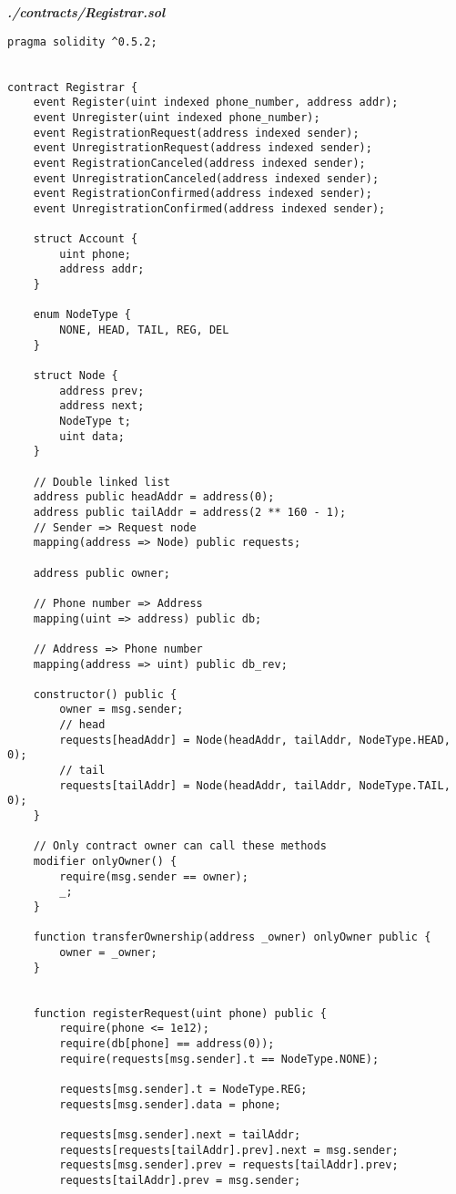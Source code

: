 \textit{\textbf{./contracts/Registrar.sol}}
\begin{verbatim}
pragma solidity ^0.5.2;


contract Registrar {
    event Register(uint indexed phone_number, address addr);
    event Unregister(uint indexed phone_number);
    event RegistrationRequest(address indexed sender);
    event UnregistrationRequest(address indexed sender);
    event RegistrationCanceled(address indexed sender);
    event UnregistrationCanceled(address indexed sender);
    event RegistrationConfirmed(address indexed sender);
    event UnregistrationConfirmed(address indexed sender);

    struct Account {
        uint phone;
        address addr;
    }

    enum NodeType {
        NONE, HEAD, TAIL, REG, DEL
    }

    struct Node {
        address prev;
        address next;
        NodeType t;
        uint data;
    }

    // Double linked list
    address public headAddr = address(0);
    address public tailAddr = address(2 ** 160 - 1);
    // Sender => Request node
    mapping(address => Node) public requests;

    address public owner;

    // Phone number => Address
    mapping(uint => address) public db;

    // Address => Phone number
    mapping(address => uint) public db_rev;

    constructor() public {
        owner = msg.sender;
        // head
        requests[headAddr] = Node(headAddr, tailAddr, NodeType.HEAD, 0);
        // tail
        requests[tailAddr] = Node(headAddr, tailAddr, NodeType.TAIL, 0);
    }

    // Only contract owner can call these methods
    modifier onlyOwner() {
        require(msg.sender == owner);
        _;
    }

    function transferOwnership(address _owner) onlyOwner public {
        owner = _owner;
    }


    function registerRequest(uint phone) public {
        require(phone <= 1e12);
        require(db[phone] == address(0));
        require(requests[msg.sender].t == NodeType.NONE);

        requests[msg.sender].t = NodeType.REG;
        requests[msg.sender].data = phone;

        requests[msg.sender].next = tailAddr;
        requests[requests[tailAddr].prev].next = msg.sender;
        requests[msg.sender].prev = requests[tailAddr].prev;
        requests[tailAddr].prev = msg.sender;


\end{verbatim}
